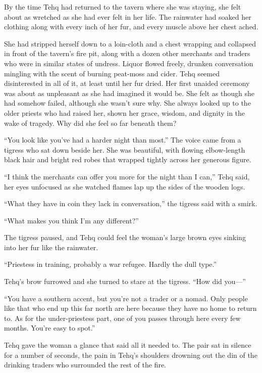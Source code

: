 By the time Tehq had returned to the tavern where she was staying, she felt about as wretched as she had ever felt in her life. The rainwater had soaked her clothing along with every inch of her fur, and every muscle above her chest ached.

She had stripped herself down to a loin-cloth and a chest wrapping and collapsed in front of the tavern's fire pit, along with a dozen other merchants and traders who were in similar states of undress. Liquor flowed freely, drunken conversation mingling with the scent of burning peat-moss and cider. Tehq seemed disinterested in all of it, at least until her fur dried. Her first unaided ceremony was about as unpleasant as she had imagined it would be. She felt as though she had somehow failed, although she wasn't sure why. She always looked up to the older priests who had raised her, shown her grace, wisdom, and dignity in the wake of tragedy. Why did she feel so far beneath them?

``You look like you've had a harder night than most.'' The voice came from a tigress who sat down beside her. She was beautiful, with flowing elbow-length black hair and bright red robes that wrapped tightly across her generous figure.

``I think the merchants can offer you more for the night than I can,'' Tehq said, her eyes unfocused as she watched flames lap up the sides of the wooden logs.

``What they have in coin they lack in conversation,'' the tigress said with a smirk.

``What makes you think I'm any different?''

The tigress paused, and Tehq could feel the woman's large brown eyes sinking into her fur like the rainwater.

``Priestess in training, probably a war refugee. Hardly the dull type.''

Tehq's brow furrowed and she turned to stare at the tigress. ``How did you---''

``You have a southern accent, but you're not a trader or a nomad. Only people like that who end up this far north are here because they have no home to return to. As for the under-priestess part, one of you passes through here every few months. You're easy to spot.''

Tehq gave the woman a glance that said all it needed to. The pair sat in silence for a number of seconds, the pain in Tehq's shoulders drowning out the din of the drinking traders who surrounded the rest of the fire.

